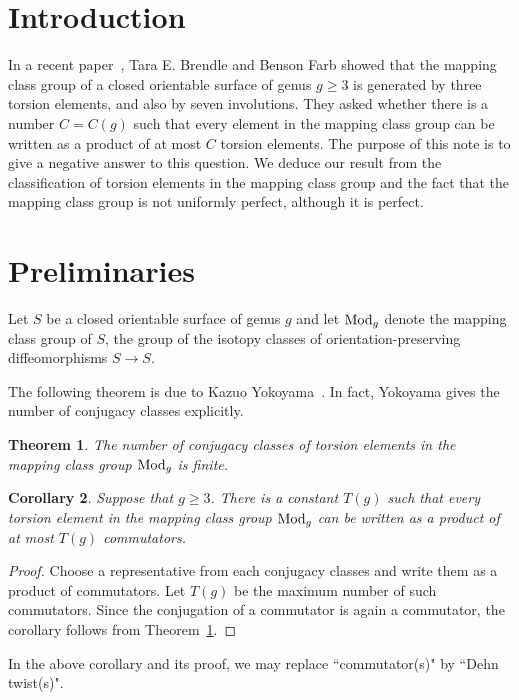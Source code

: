 \documentclass[11pt]{amsart}
\newtheorem{theorem}{Theorem}%
\newtheorem{corollary}[theorem]{Corollary}
\theoremstyle{definition}
\theoremstyle{remark}
\def\mod{{\rm Mod}}
\begin{document}
  \setcounter{secnumdepth}{1}
 \setcounter{section}{0}

\section{Introduction} 

In a recent paper~\cite{bf}, Tara E. Brendle and Benson Farb showed that the mapping class group
of a closed orientable surface of genus $g\geq 3$ is generated by three torsion elements,
and also by seven involutions. They asked whether there is a number
$C=C(g)$ such that every element in the mapping class group  can be written as a 
product of at most $C$ torsion elements. The purpose of this note is to give a negative
answer to this question. We deduce our result from the classification of torsion 
elements in the mapping class group and the fact that the mapping class group is 
not uniformly perfect, although it is perfect.

\section{Preliminaries}
Let $S$ be a closed orientable surface of genus $g$ and let $\mod_g$ denote
the mapping 
class group of $S$, the group of the isotopy classes of orientation-preserving 
diffeomorphisms $S\to S$. 

The following theorem is due to Kazuo Yokoyama~\cite{y}. In fact, Yokoyama
gives the number of conjugacy classes explicitly.
 
\begin{theorem}   \label{thm:periodic}
The number of conjugacy classes of torsion elements in the
mapping class group $\mod_g$ is finite.
 \end{theorem}

\begin{corollary}  \label{cor:periodic}
Suppose that $g\geq 3$.
There is a constant $T(g)$ such that every torsion element in the
mapping class group $\mod_g$ can be written as a product of at most $T(g)$
commutators.
 \end{corollary}
\begin{proof}
Choose a representative from each conjugacy classes and write them as a product of 
commutators. Let $T(g)$ be the maximum number of such commutators.
Since the conjugation of a commutator is again a commutator, the corollary
follows from Theorem~\ref{thm:periodic}.
\end{proof}

In the above corollary and its proof, we may replace ``commutator(s)" by ``Dehn twist(s)".
\end{document}
